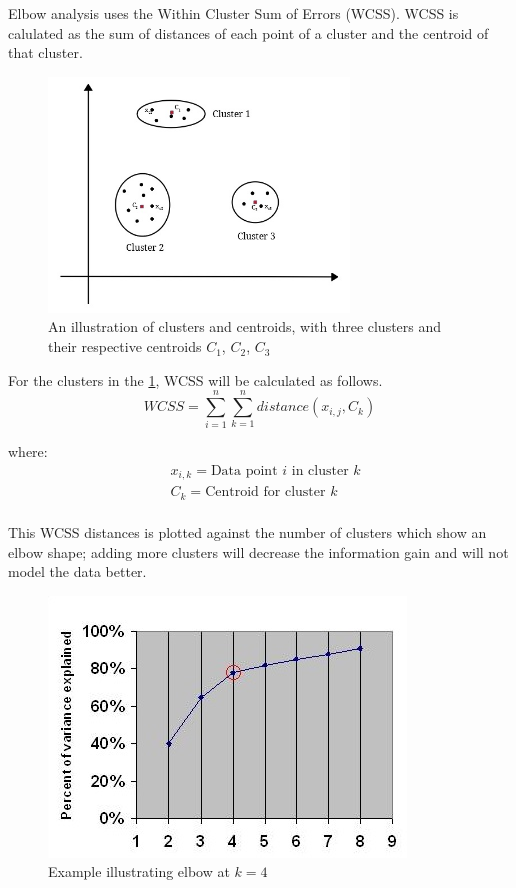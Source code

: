 Elbow analysis uses the Within Cluster Sum of Errors (WCSS). WCSS is calulated as the sum of distances of each point of a cluster and the centroid of that cluster. 

\begin{figure}[!ht]
    \centering
    \includegraphics[width=8cm,keepaspectratio]{pics/Elbow.jpg}
     \captionsetup{justification=centering,margin=2cm}
    \caption{An illustration of clusters and centroids, with three clusters and their respective centroids $C_{1}$, $C_{2}$, $C_{3}$}
    \label{fig:elbow}
\end{figure}

For the clusters in the \ref{fig:elbow}, WCSS will be calculated as follows.
\begin{equation}
   WCSS = \sum_{i=1 }^{n}\sum_{k=1}^{n}distance(x_{i,j},C_{k})
\end{equation}

where:
\begin{align*}
      & x_{i,k}=\text{Data point $i$ in cluster $k$}\\
      & C_{k}=\text{Centroid for cluster $k$}\\
\end{align*}

This WCSS distances is plotted against the number of clusters which show an elbow shape; adding more clusters will decrease the information gain and will not model the data better.

\begin{figure}[!ht]
    \centering
    \includegraphics{pics/elbow_at_4.jpg}
     \captionsetup{justification=centering,margin=2cm}
    \caption{Example illustrating elbow at $k =4$ }
    \label{fig:elbow_at_4}
\end{figure}

